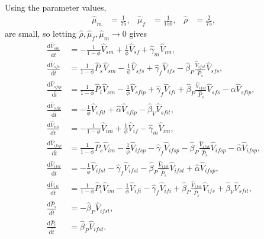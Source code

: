 \documentclass{article}
\newcommand{\md}{\mathrm{d}}
\begin{document}
Using the parameter values,
\begin{equation}
  \begin{aligned}
    \hat{\mu}_m &= \frac{1}{75},
    &
    \hat{\mu}_f &= \frac{1}{150},
    &
    \hat{\rho} &= \frac{2}{75},
  \end{aligned}
\end{equation}
are small, so letting $\hat{\rho}, \hat{\mu}_f, \hat{\mu}_m \to 0$ gives
\begin{equation}
  \begin{split}
    \frac{\md \hat{V}_{sm}}{\md \hat{t}}
    &=
    - \frac{1}{1 - \phi} \hat{V}_{sm}
    + \frac{1}{\phi} \hat{V}_{sf}
    + \hat{\gamma}_m \hat{V}_{im},
    \\
    \frac{\md \hat{V}_{sfs}}{\md \hat{t}}
    &=
    \frac{1}{1 - \phi} \hat{P}_s \hat{V}_{sm}
    - \frac{1}{\phi} \hat{V}_{sfs}
    + \hat{\gamma}_f \hat{V}_{ifs}
    - \hat{\beta}_P \frac{\hat{V}_{ifst}}{\hat{P}_s} \hat{V}_{sfs},
    \\
    \frac{\md \hat{V}_{sfip}}{\md \hat{t}}
    &=
    \frac{1}{1 - \phi} \hat{P}_i \hat{V}_{sm}
    - \frac{1}{\phi} \hat{V}_{sfip}
    + \hat{\gamma}_f \hat{V}_{ifi}
    + \hat{\beta}_P \frac{\hat{V}_{ifst}}{\hat{P}_s} \hat{V}_{sfs}
    - \hat{\alpha} \hat{V}_{sfip},
    \\
    \frac{\md \hat{V}_{sfit}}{\md \hat{t}}
    &=
    - \frac{1}{\phi} \hat{V}_{sfit}
    + \hat{\alpha} \hat{V}_{sfip}
    - \hat{\beta}_V \hat{V}_{sfit},
    \\
    \frac{\md \hat{V}_{im}}{\md \hat{t}}
    &=
    - \frac{1}{1 - \phi} \hat{V}_{im}
    + \frac{1}{\phi} \hat{V}_{if}
    - \hat{\gamma}_m \hat{V}_{im},
    \\
    \frac{\md \hat{V}_{ifsp}}{\md \hat{t}}
    &=
    \frac{1}{1 - \phi} \hat{P}_s \hat{V}_{im}
    - \frac{1}{\phi} \hat{V}_{ifsp}
    - \hat{\gamma}_f \hat{V}_{ifsp}
    - \hat{\beta}_P \frac{\hat{V}_{ifst}}{\hat{P}_s} \hat{V}_{ifsp}
    - \hat{\alpha} \hat{V}_{ifsp},
    \\
    \frac{\md \hat{V}_{ifst}}{\md \hat{t}}
    &=
    - \frac{1}{\phi} \hat{V}_{ifst}
    - \hat{\gamma}_f \hat{V}_{ifst}
    - \hat{\beta}_P \frac{\hat{V}_{ifst}}{\hat{P}_s} \hat{V}_{ifst}
    + \hat{\alpha} \hat{V}_{ifsp},
    \\
    \frac{\md \hat{V}_{ifi}}{\md \hat{t}}
    &=
    \frac{1}{1 - \phi} \hat{P}_i \hat{V}_{im}
    - \frac{1}{\phi} \hat{V}_{ifi}
    - \hat{\gamma}_f \hat{V}_{ifi}
    + \hat{\beta}_P \frac{\hat{V}_{ifst}}{\hat{P}_s} \hat{V}_{ifs}
    + \hat{\beta}_V \hat{V}_{sfit},
    \\
    \frac{\md \hat{P}_s}{\md \hat{t}}
    &=
    - \hat{\beta}_P \hat{V}_{ifst},
    \\
    \frac{\md \hat{P}_i}{\md \hat{t}}
    &=
    \hat{\beta}_P \hat{V}_{ifst}.
  \end{split}
\end{equation}
\end{document}
